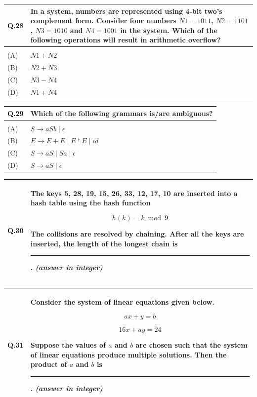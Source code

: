 \documentclass[14pt]{article}
\begin{document}
\vspace{0.3cm}

\begin{tabular}{|p{1.5cm}|p{12cm}|}
\hline
Q.28 &
\parbox[t]{\linewidth}{
In a system, numbers are represented using 4-bit two's complement form. Consider four numbers $N1=1011$, $N2=1101$, $N3=1010$ and $N4=1001$ in the system. Which of the following operations will result in arithmetic overflow?
}

\rule{0pt}{0.8cm}
\\
\hline
& \\
\hline
(A) & $N1+N2$ \\
\hline
(B) & $N2+N3$ \\
\hline
(C) & $N3-N4$ \\
\hline
(D) & $N1+N4$ \\
\hline
\end{tabular}

\vspace{0.3cm}

\begin{tabular}{|p{1.5cm}|p{12cm}|}
\hline
Q.29 &
Which of the following grammars is/are ambiguous?
\\
\hline
& \\
\hline
(A) & $S \rightarrow aSb \mid \epsilon$ \\
\hline
(B) & $E \rightarrow E+E \mid E*E \mid id$ \\
\hline
(C) & $S \rightarrow aS \mid Sa \mid \epsilon$ \\
\hline
(D) & $S \rightarrow aS \mid \epsilon$ \\
\hline
\end{tabular}

\vspace{0.3cm}

\begin{tabular}{|p{1.5cm}|p{12cm}|}
\hline
Q.30 &
\parbox[t]{\linewidth}{
The keys 5, 28, 19, 15, 26, 33, 12, 17, 10 are inserted into a hash table using the hash function

\[
h(k)=k \bmod 9
\]

The collisions are resolved by chaining. After all the keys are inserted, the length of the longest chain is \rule{2cm}{0.15mm}. \textit{(answer in integer)}
}
\\
\hline
\end{tabular}

\vspace{0.3cm}

\begin{tabular}{|p{1.5cm}|p{12cm}|}
\hline
Q.31 &
\parbox[t]{\linewidth}{
Consider the system of linear equations given below.

\[
ax+y=b
\]

\[
16x+ay=24
\]

Suppose the values of $a$ and $b$ are chosen such that the system of linear equations produce multiple solutions. Then the product of $a$ and $b$ is \rule{2cm}{0.15mm}. \textit{(answer in integer)}
}
\\
\hline
\end{tabular}
\end{document}
